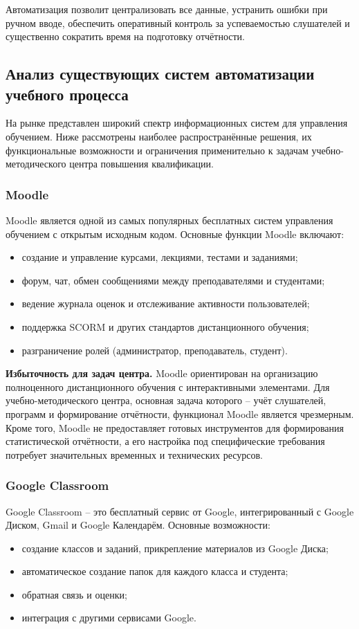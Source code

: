 Автоматизация позволит централизовать все данные, устранить ошибки при ручном вводе, обеспечить оперативный контроль за успеваемостью слушателей и существенно сократить время на подготовку отчётности.

\subsection{Анализ существующих систем автоматизации учебного процесса}

На рынке представлен широкий спектр информационных систем для управления обучением. Ниже рассмотрены наиболее распространённые решения, их функциональные возможности и ограничения применительно к задачам учебно-методического центра повышения квалификации.

\subsubsection{Moodle}
Moodle является одной из самых популярных бесплатных систем управления обучением с открытым исходным кодом. Основные функции Moodle включают:
\begin{itemize}
	\item создание и управление курсами, лекциями, тестами и заданиями;
	\item форум, чат, обмен сообщениями между преподавателями и студентами;
	\item ведение журнала оценок и отслеживание активности пользователей;
	\item поддержка SCORM и других стандартов дистанционного обучения;
	\item разграничение ролей (администратор, преподаватель, студент).
\end{itemize}

\textbf{Избыточность для задач центра.} Moodle ориентирован на организацию полноценного дистанционного обучения с интерактивными элементами. Для учебно-методического центра, основная задача которого – учёт слушателей, программ и формирование отчётности, функционал Moodle является чрезмерным. Кроме того, Moodle не предоставляет готовых инструментов для формирования статистической отчётности, а его настройка под специфические требования потребует значительных временных и технических ресурсов.

\subsubsection{Google Classroom}
Google Classroom – это бесплатный сервис от Google, интегрированный с Google Диском, Gmail и Google Календарём. Основные возможности:
\begin{itemize}
	\item создание классов и заданий, прикрепление материалов из Google Диска;
	\item автоматическое создание папок для каждого класса и студента;
	\item обратная связь и оценки;
	\item интеграция с другими сервисами Google.
\end{itemize}

